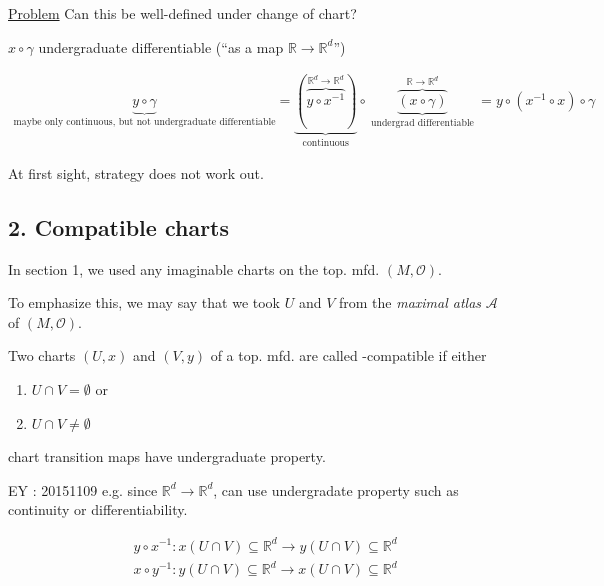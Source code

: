 \underline{Problem} Can this be well-defined under change of chart?


$x\circ \gamma$ undergraduate differentiable (``as a map $\mathbb{R} \to \mathbb{R}^d$'')

\[
\begin{gathered}
\underbrace{y\circ \gamma}_{\text{maybe only continuous, but not undergraduate differentiable} } =  \underbrace{ ( \overbrace{ y\circ x^{-1}}^{\mathbb{R}^d \to \mathbb{R}^d }   )}_{\text{continuous}}  \circ \underbrace{ \overbrace{ (x\circ \gamma) }^{\mathbb{R}\to \mathbb{R}^d} }_{ \text{ undergrad differentiable } }  = y \circ (x^{-1} \circ x) \circ \gamma
\end{gathered}
\]

At first sight, strategy does not work out.  

\subsection{2. Compatible charts}

In section 1, we used any imaginable charts on the top. mfd. $(M,\mathcal{O})$.  

To emphasize this, we may say that we took $U$ and $V$ from the \emph{maximal atlas} $\mathcal{A}$ of $(M,\mathcal{O})$.  


\begin{definition}
Two charts $(U,x)$ and $(V,y)$ of a top. mfd. are called -compatible if 
either
\begin{enumerate}
\item[(a)] $U \cap V = \emptyset$
or  \item[(b)] $U\cap V \neq \emptyset$
\end{enumerate}
chart transition maps have undergraduate  property.

EY : 20151109 e.g. since $\mathbb{R}^d \to \mathbb{R}^d$, can use undergradate  property such as continuity or differentiability.

\[
\begin{aligned}
& y \circ x^{-1} : x(U \cap V) \subseteq \mathbb{R}^d  \to y(U\cap V) \subseteq \mathbb{R}^d  \\
& x\circ y^{-1} : y(U\cap V) \subseteq \mathbb{R}^d   \to x(U\cap V) \subseteq \mathbb{R}^d
\end{aligned}
\]
\end{definition}

